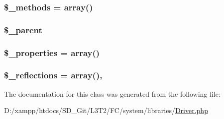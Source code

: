 \subsubsection[{\$\+\_\+methods}]{\setlength{\rightskip}{0pt plus 5cm}\$\+\_\+methods = array()\hspace{0.3cm}{\ttfamily [protected]}}\label{class_c_i___driver_a148e2042f169cec802078e58a46ace92}
\hypertarget{class_c_i___driver_a8c040f02d9e695416231845d2aaf7f59}{}
\subsubsection[{\$\+\_\+parent}]{\setlength{\rightskip}{0pt plus 5cm}\$\+\_\+parent\hspace{0.3cm}{\ttfamily [protected]}}\label{class_c_i___driver_a8c040f02d9e695416231845d2aaf7f59}
\hypertarget{class_c_i___driver_a677f712430f384ffa402fac50940ace4}{}
\subsubsection[{\$\+\_\+properties}]{\setlength{\rightskip}{0pt plus 5cm}\$\+\_\+properties = array()\hspace{0.3cm}{\ttfamily [protected]}}\label{class_c_i___driver_a677f712430f384ffa402fac50940ace4}
\hypertarget{class_c_i___driver_a3eae4dfd334261dd94fe0e148501513f}{}
\subsubsection[{\$\+\_\+reflections}]{\setlength{\rightskip}{0pt plus 5cm}\$\+\_\+reflections = array()\hspace{0.3cm}{\ttfamily [static]}, {\ttfamily [protected]}}\label{class_c_i___driver_a3eae4dfd334261dd94fe0e148501513f}


The documentation for this class was generated from the following file\+:\begin{DoxyCompactItemize}
\item 
D\+:/xampp/htdocs/\+S\+D\+\_\+\+Git/\+L3\+T2/\+F\+C/system/libraries/\hyperlink{system_2libraries_2_driver_8php}{Driver.\+php}\end{DoxyCompactItemize}
